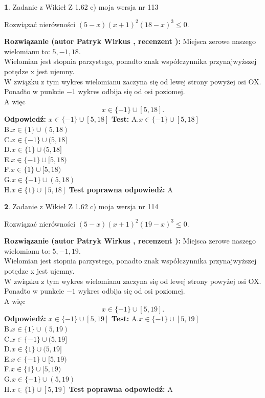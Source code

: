 \documentclass[12pt, a4paper]{article}
\theoremstyle{definition} %
\newtheorem{zad}{}
\newcommand{\zadStart}[1]{\begin{zad}#1\newline}
\newcommand{\zadStop}{\end{zad}}
\newcommand{\rozwStart}[2]{\noindent \textbf{Rozwiązanie (autor #1 , recenzent #2): }\newline}
\newcommand{\rozwStop}{\newline}
\newcommand{\odpStart}{\noindent \textbf{Odpowiedź:}\newline}
\newcommand{\odpStop}{\newline}
\newcommand{\testStart}{\noindent \textbf{Test:}\newline}
\newcommand{\testStop}{\newline}
\newcommand{\kluczStart}{\noindent \textbf{Test poprawna odpowiedź:}\newline}
\newcommand{\kluczStop}{\newline}
\begin{document}
\zadStart{Zadanie z Wikieł Z 1.62 c) moja wersja nr 113}

Rozwiązać nierówności $(5-x)(x+1)^{2}(18-x)^{3}\le0$.
\zadStop
\rozwStart{Patryk Wirkus}{}
Miejsca zerowe naszego wielomianu to: $5, -1, 18$.\\
Wielomian jest stopnia parzystego, ponadto znak współczynnika przy\linebreak najwyższej potędze x jest ujemny.\\ W związku z tym wykres wielomianu zaczyna się od lewej strony powyżej osi OX.\\
Ponadto w punkcie $-1$ wykres odbija się od osi poziomej.\\
A więc $$x \in \{-1\} \cup [5,18].$$
\rozwStop
\odpStart
$x \in \{-1\} \cup [5,18]$
\odpStop
\testStart
A.$x \in \{-1\} \cup [5,18]$\\
B.$x \in \{1\} \cup (5,18)$\\
C.$x \in \{-1\} \cup (5,18]$\\
D.$x \in \{1\} \cup (5,18]$\\
E.$x \in \{-1\} \cup [5,18)$\\
F.$x \in \{1\} \cup [5,18)$\\
G.$x \in \{-1\} \cup (5,18)$\\
H.$x \in \{1\} \cup [5,18]$
\testStop
\kluczStart
A
\kluczStop



\zadStart{Zadanie z Wikieł Z 1.62 c) moja wersja nr 114}

Rozwiązać nierówności $(5-x)(x+1)^{2}(19-x)^{3}\le0$.
\zadStop
\rozwStart{Patryk Wirkus}{}
Miejsca zerowe naszego wielomianu to: $5, -1, 19$.\\
Wielomian jest stopnia parzystego, ponadto znak współczynnika przy\linebreak najwyższej potędze x jest ujemny.\\ W związku z tym wykres wielomianu zaczyna się od lewej strony powyżej osi OX.\\
Ponadto w punkcie $-1$ wykres odbija się od osi poziomej.\\
A więc $$x \in \{-1\} \cup [5,19].$$
\rozwStop
\odpStart
$x \in \{-1\} \cup [5,19]$
\odpStop
\testStart
A.$x \in \{-1\} \cup [5,19]$\\
B.$x \in \{1\} \cup (5,19)$\\
C.$x \in \{-1\} \cup (5,19]$\\
D.$x \in \{1\} \cup (5,19]$\\
E.$x \in \{-1\} \cup [5,19)$\\
F.$x \in \{1\} \cup [5,19)$\\
G.$x \in \{-1\} \cup (5,19)$\\
H.$x \in \{1\} \cup [5,19]$
\testStop
\kluczStart
A
\kluczStop
\end{document}
